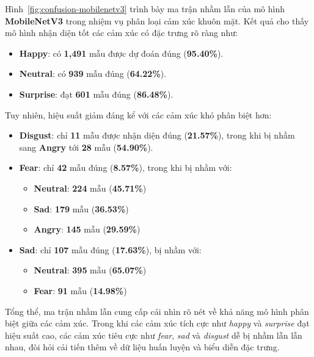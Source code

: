 Hình~\ref{fig:confusion-mobilenetv3} trình bày ma trận nhầm lẫn của mô hình \textbf{MobileNetV3} trong nhiệm vụ phân loại cảm xúc khuôn mặt. Kết quả cho thấy mô hình nhận diện tốt các cảm xúc có đặc trưng rõ ràng như:

\begin{itemize}
    \item \textbf{Happy}: có \textbf{1,491} mẫu được dự đoán đúng (\textbf{95.40\%}).
    \item \textbf{Neutral}: có \textbf{939} mẫu đúng (\textbf{64.22\%}).
    \item \textbf{Surprise}: đạt \textbf{601} mẫu đúng (\textbf{86.48\%}).
\end{itemize}

Tuy nhiên, hiệu suất giảm đáng kể với các cảm xúc khó phân biệt hơn:

\begin{itemize}
    \item \textbf{Disgust}: chỉ \textbf{11} mẫu được nhận diện đúng (\textbf{21.57\%}), trong khi bị nhầm sang \textbf{Angry} tới \textbf{28} mẫu (\textbf{54.90\%}).
    
    \item \textbf{Fear}: chỉ \textbf{42} mẫu đúng (\textbf{8.57\%}), trong khi bị nhầm với:
    \begin{itemize}
        \item \textbf{Neutral}: \textbf{224} mẫu (\textbf{45.71\%})
        \item \textbf{Sad}: \textbf{179} mẫu (\textbf{36.53\%})
        \item \textbf{Angry}: \textbf{145} mẫu (\textbf{29.59\%})
    \end{itemize}

    \item \textbf{Sad}: chỉ \textbf{107} mẫu đúng (\textbf{17.63\%}), bị nhầm với:
    \begin{itemize}
        \item \textbf{Neutral}: \textbf{395} mẫu (\textbf{65.07\%})
        \item \textbf{Fear}: \textbf{91} mẫu (\textbf{14.98\%})
    \end{itemize}
\end{itemize}

Tổng thể, ma trận nhầm lẫn cung cấp cái nhìn rõ nét về khả năng mô hình phân biệt giữa các cảm xúc. Trong khi các cảm xúc tích cực như \textit{happy} và \textit{surprise} đạt hiệu suất cao, các cảm xúc tiêu cực như \textit{fear}, \textit{sad} và \textit{disgust} dễ bị nhầm lẫn lẫn nhau, đòi hỏi cải tiến thêm về dữ liệu huấn luyện và biểu diễn đặc trưng.


